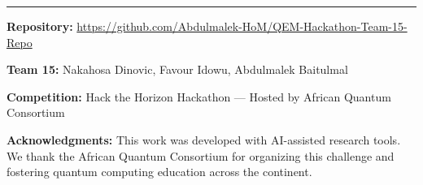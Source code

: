 \documentclass[11pt, a4paper]{article}
\begin{document}
\vspace{1cm}
\hrule
\vspace{0.5cm}
\textbf{Repository:} \url{https://github.com/Abdulmalek-HoM/QEM-Hackathon-Team-15-Repo}

\textbf{Team 15:} Nakahosa Dinovic, Favour Idowu, Abdulmalek Baitulmal

\textbf{Competition:} Hack the Horizon Hackathon --- Hosted by African Quantum Consortium

\textbf{Acknowledgments:} This work was developed with AI-assisted research tools.
We thank the African Quantum Consortium for organizing this challenge and
fostering quantum computing education across the continent.
\end{document}
